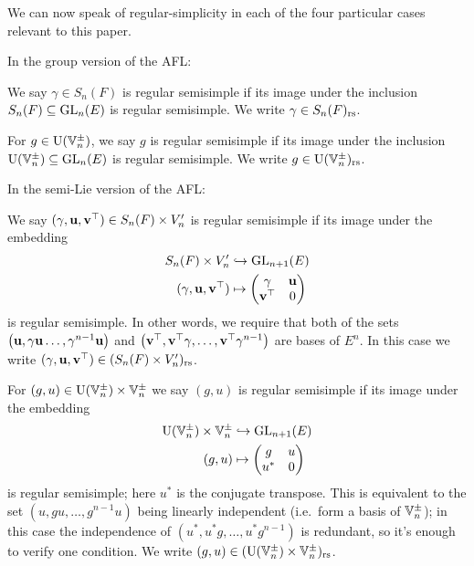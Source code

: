We can now speak of regular-simplicity in each of the four
particular cases relevant to this paper.
\begin{definition}
  In the group version of the AFL:
  \begin{itemize}
    \ii We say $\gamma \in S_n(F)$ is regular semisimple
    if its image under the inclusion $S_n(F) \subseteq \operatorname{GL}_n(E)$ is regular semisimple.
    We write $\gamma \in S_n(F)_{\mathrm{rs}}$.

    \ii For $g \in \operatorname{U}(\mathbb V_n^\pm)$,
    we say $g$ is regular semisimple
    if its image under the inclusion $\operatorname{U}(\mathbb V_n^\pm) \subseteq \operatorname{GL}_n(E)$ is regular semisimple.
    We write $g \in \operatorname{U}(\mathbb V_n^\pm)_{\mathrm{rs}}$.
  \end{itemize}
  In the semi-Lie version of the AFL:
  \begin{itemize}
    \ii We say $(\gamma, \mathbf u, \mathbf v^\top) \in S_n(F) \times V_n'$
    is regular semisimple if its image under the embedding
    \begin{equation}
      \begin{aligned}
        S_n(F) \times V_n' &\hookrightarrow \operatorname{GL}_{n+1}(E) \\
        (\gamma, \mathbf u, \mathbf v^\top) &\mapsto \begin{pmatrix} \gamma & \mathbf u \\ \mathbf v^\top & 0 \end{pmatrix}
      \end{aligned}
      \label{eq:embed_FJ_analytic}
    \end{equation}
    is regular semisimple.
    In other words, we require that
    both of the sets
    $\left( \mathbf u, \gamma \mathbf u \dots, \gamma^{n-1}\mathbf u \right)$
    and
    $\left( \mathbf v^\top, \mathbf v^\top \gamma, \dots, \mathbf v^\top \gamma^{n-1} \right)$
    are bases of $E^n$.
    In this case we write $(\gamma, \mathbf u, \mathbf v^\top) \in (S_n(F) \times V_n')_{\mathrm{rs}}$.

    \ii For $(g,u) \in \operatorname{U}(\mathbb V_n^\pm) \times \mathbb V_n^\pm$ we say $(g, u)$
    is regular semisimple if its image under the embedding
    \begin{equation}
      \begin{aligned}
        \operatorname{U}(\mathbb V_n^\pm) \times \mathbb V_n^\pm &\hookrightarrow \operatorname{GL}_{n+1}(E) \\
        (g, u) &\mapsto \begin{pmatrix} g & u \\ u^\ast & 0 \end{pmatrix}
      \end{aligned}
      \label{eq:embed_FJ_geometric}
    \end{equation}
    is regular semisimple; here $u^\ast$ is the conjugate transpose.
    This is equivalent to the set $\left(  u, gu, \dots, g^{n-1}u \right)$
    being linearly independent (i.e.\ form a basis of $\mathbb V_n^\pm$);
    in this case the independence of $\left( u^\ast, u^\ast g, \dots, u^\ast g^{n-1} \right)$
    is redundant, so it's enough to verify one condition.
    We write $(g,u) \in (\operatorname{U}(\mathbb V_n^\pm) \times \mathbb V_n^\pm)_{\mathrm{rs}}$.
  \end{itemize}
  \label{def:regular}
\end{definition}

